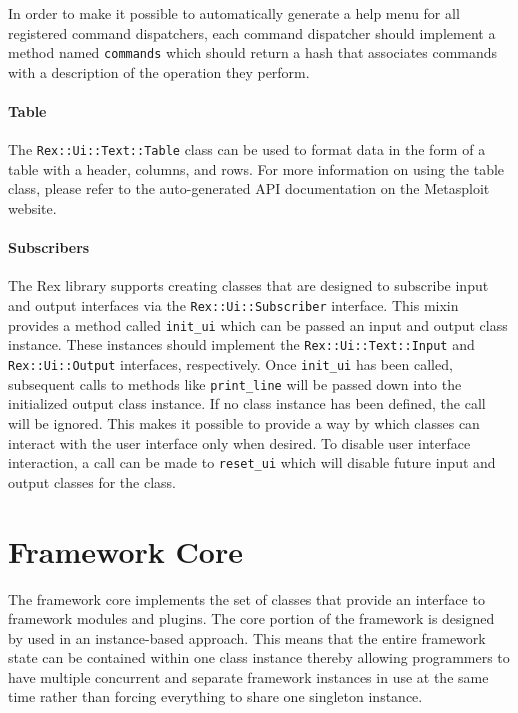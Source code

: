 \documentclass{report}
\begin{document}
\par
In order to make it possible to automatically generate a help menu
for all registered command dispatchers, each command dispatcher
should implement a method named \texttt{commands} which should
return a hash that associates commands with a description of the
operation they perform.

            \subsubsection{Table}

\par
The \texttt{Rex::Ui::Text::Table} class can be used to format data
in the form of a table with a header, columns, and rows.  For more
information on using the table class, please refer to the
auto-generated API documentation on the Metasploit website.

            \subsubsection{Subscribers}

\par
The Rex library supports creating classes that are designed to
subscribe input and output interfaces via the
\texttt{Rex::Ui::Subscriber} interface.  This mixin provides a
method called \texttt{init\_ui} which can be passed an input and
output class instance.  These instances should implement the
\texttt{Rex::Ui::Text::Input} and \texttt{Rex::Ui::Output}
interfaces, respectively.  Once \texttt{init\_ui} has been called,
subsequent calls to methods like \texttt{print\_line} will be passed
down into the initialized output class instance.  If no class
instance has been defined, the call will be ignored.  This makes it
possible to provide a way by which classes can interact with the
user interface only when desired.  To disable user interface
interaction, a call can be made to \texttt{reset\_ui} which will
disable future input and output classes for the class.

\chapter{Framework Core}

\par
The framework core implements the set of classes that provide an
interface to framework modules and plugins.  The core portion of the
framework is designed by used in an instance-based approach.  This
means that the entire framework state can be contained within one
class instance thereby allowing programmers to have multiple
concurrent and separate framework instances in use at the same time
rather than forcing everything to share one singleton instance.
\end{document}
